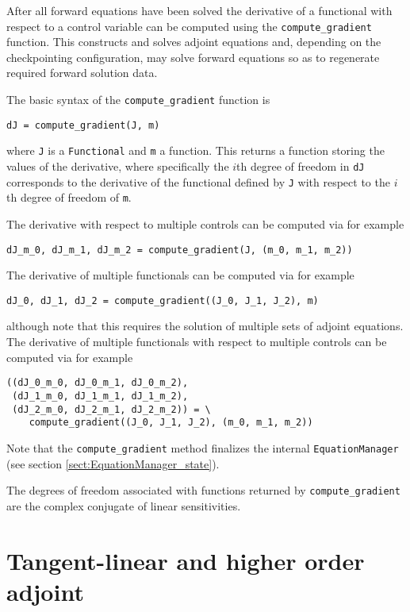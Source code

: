 \documentclass[11pt]{article}
\begin{document}
After all forward equations have been solved the derivative of a functional
with respect to a control variable can be computed using the
\texttt{compute\_gradient} function. This constructs and solves adjoint
equations and, depending on the checkpointing configuration, may solve forward
equations so as to regenerate required forward solution data.

The basic syntax of the \texttt{compute\_gradient} function is
\begin{lstlisting}
dJ = compute_gradient(J, m)
\end{lstlisting}
where \texttt{J} is a \texttt{Functional} and \texttt{m} a function. This
returns a function storing the values of the derivative, where specifically the
$i$th degree of freedom in \texttt{dJ} corresponds to the derivative of the
functional defined by \texttt{J} with respect to the $i$th degree of freedom of
\texttt{m}.

The derivative with respect to multiple controls can be computed via for
example
\begin{lstlisting}
dJ_m_0, dJ_m_1, dJ_m_2 = compute_gradient(J, (m_0, m_1, m_2))
\end{lstlisting}
The derivative of multiple functionals can be computed via for example
\begin{lstlisting}
dJ_0, dJ_1, dJ_2 = compute_gradient((J_0, J_1, J_2), m)
\end{lstlisting}
although note that this requires the solution of multiple sets of adjoint
equations. The derivative of multiple functionals with respect to multiple
controls can be computed via for example
\begin{lstlisting}
((dJ_0_m_0, dJ_0_m_1, dJ_0_m_2),
 (dJ_1_m_0, dJ_1_m_1, dJ_1_m_2),
 (dJ_2_m_0, dJ_2_m_1, dJ_2_m_2)) = \
    compute_gradient((J_0, J_1, J_2), (m_0, m_1, m_2))
\end{lstlisting}

Note that the \texttt{compute\_gradient} method finalizes the internal
\texttt{EquationManager} (see section \ref{sect:EquationManager_state}).

The degrees of freedom associated with functions returned by
\texttt{compute\_gradient} are the complex conjugate of linear sensitivities.

\section{Tangent-linear and higher order adjoint}\label{sect:higher_order}
\end{document}
